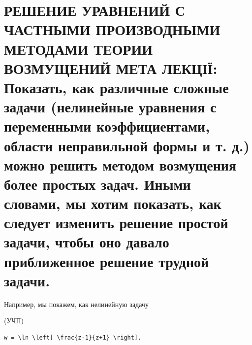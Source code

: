 \documentclass[
  ukrainian,
]{article}
\begin{document}
\section{РЕШЕНИЕ УРАВНЕНИЙ С ЧАСТНЫМИ ПРОИЗВОДНЫМИ МЕТОДАМИ ТЕОРИИ
ВОЗМУЩЕНИЙ МЕТА ЛЕКЦІЇ: Показать, как различные сложные задачи
(нелинейные уравнения с переменными коэффициентами, области неправильной
формы и т. д.) можно решить методом возмущения более простых задач.
Иными словами, мы хотим показать, как следует изменить решение простой
задачи, чтобы оно давало приближенное решение трудной
задачи.}\label{ux440ux435ux448ux435ux43dux438ux435-ux443ux440ux430ux432ux43dux435ux43dux438ux439-ux441-ux447ux430ux441ux442ux43dux44bux43cux438-ux43fux440ux43eux438ux437ux432ux43eux434ux43dux44bux43cux438-ux43cux435ux442ux43eux434ux430ux43cux438-ux442ux435ux43eux440ux438ux438-ux432ux43eux437ux43cux443ux449ux435ux43dux438ux439-ux43cux435ux442ux430-ux43bux435ux43aux446ux456ux457-ux43fux43eux43aux430ux437ux430ux442ux44c-ux43aux430ux43a-ux440ux430ux437ux43bux438ux447ux43dux44bux435-ux441ux43bux43eux436ux43dux44bux435-ux437ux430ux434ux430ux447ux438-ux43dux435ux43bux438ux43dux435ux439ux43dux44bux435-ux443ux440ux430ux432ux43dux435ux43dux438ux44f-ux441-ux43fux435ux440ux435ux43cux435ux43dux43dux44bux43cux438-ux43aux43eux44dux444ux444ux438ux446ux438ux435ux43dux442ux430ux43cux438-ux43eux431ux43bux430ux441ux442ux438-ux43dux435ux43fux440ux430ux432ux438ux43bux44cux43dux43eux439-ux444ux43eux440ux43cux44b-ux438-ux442.-ux434.-ux43cux43eux436ux43dux43e-ux440ux435ux448ux438ux442ux44c-ux43cux435ux442ux43eux434ux43eux43c-ux432ux43eux437ux43cux443ux449ux435ux43dux438ux44f-ux431ux43eux43bux435ux435-ux43fux440ux43eux441ux442ux44bux445-ux437ux430ux434ux430ux447.-ux438ux43dux44bux43cux438-ux441ux43bux43eux432ux430ux43cux438-ux43cux44b-ux445ux43eux442ux438ux43c-ux43fux43eux43aux430ux437ux430ux442ux44c-ux43aux430ux43a-ux441ux43bux435ux434ux443ux435ux442-ux438ux437ux43cux435ux43dux438ux442ux44c-ux440ux435ux448ux435ux43dux438ux435-ux43fux440ux43eux441ux442ux43eux439-ux437ux430ux434ux430ux447ux438-ux447ux442ux43eux431ux44b-ux43eux43dux43e-ux434ux430ux432ux430ux43bux43e-ux43fux440ux438ux431ux43bux438ux436ux435ux43dux43dux43eux435-ux440ux435ux448ux435ux43dux438ux435-ux442ux440ux443ux434ux43dux43eux439-ux437ux430ux434ux430ux447ux438.}

Например, мы покажем, как нелинейную задачу

(УЧП)

\begin{verbatim}
w = \ln \left[ \frac{z-1}{z+1} \right].
\end{verbatim}
\end{document}
